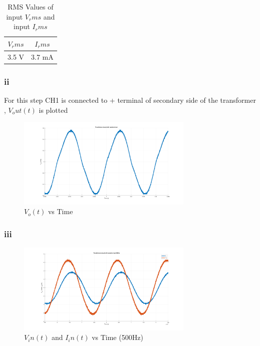 \documentclass[letterpaper,12pt]{article}
\begin{document}
\begin{table}[H]
    \begin{center}
        \caption{RMS Values of input \(V_rms\) and input \(I_rms\)}
        \vspace{2mm}
        \begin{tabular}{||c | c ||} 
            \hline
            \(V_rms\) & \(I_rms\) \\ [0.5ex] 
            \hline\hline
            3.5 V & 3.7 mA    \\
            \hline
        \end{tabular}
    \end{center}
\end{table}



\subsubsection{ii}
For this step CH1 is connected to + terminal of secondary side of the transformer , \(V_out(t)\) is plotted 
\begin{figure}[H]
    \centering
    \includegraphics[width = 0.75\textwidth]{2_2.png}
    \caption{\(V_o(t) \) vs Time}
\end{figure} 

\subsubsection{iii}
\begin{figure}[H]
    \centering
    \includegraphics[width = 0.75\textwidth]{2_3_1.png}
    \caption{\(V_in(t) \) and \(I_in(t)\) vs Time (500Hz)}
\end{figure} 
\end{document}
